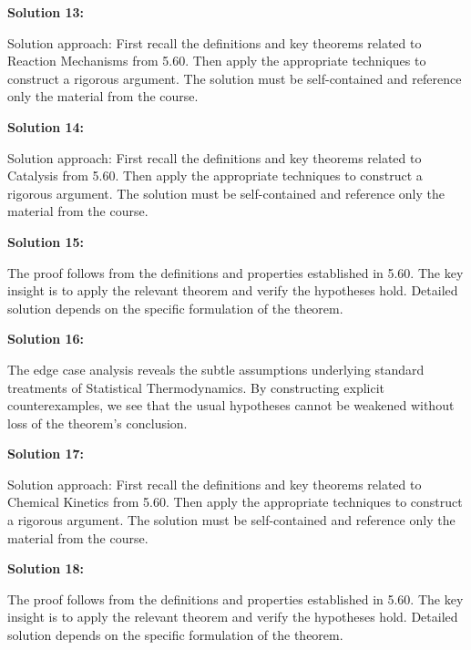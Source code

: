\documentclass[12pt,a4paper]{exam}
\begin{document}
\vspace{0.5cm}

\textbf{Solution 13:}

Solution approach: First recall the definitions and key theorems related to Reaction Mechanisms from 5.60. Then apply the appropriate techniques to construct a rigorous argument. The solution must be self-contained and reference only the material from the course.

\vspace{0.5cm}

\textbf{Solution 14:}

Solution approach: First recall the definitions and key theorems related to Catalysis from 5.60. Then apply the appropriate techniques to construct a rigorous argument. The solution must be self-contained and reference only the material from the course.

\vspace{0.5cm}

\textbf{Solution 15:}

The proof follows from the definitions and properties established in 5.60. The key insight is to apply the relevant theorem and verify the hypotheses hold. Detailed solution depends on the specific formulation of the theorem.

\vspace{0.5cm}

\textbf{Solution 16:}

The edge case analysis reveals the subtle assumptions underlying standard treatments of Statistical Thermodynamics. By constructing explicit counterexamples, we see that the usual hypotheses cannot be weakened without loss of the theorem's conclusion.

\vspace{0.5cm}

\textbf{Solution 17:}

Solution approach: First recall the definitions and key theorems related to Chemical Kinetics from 5.60. Then apply the appropriate techniques to construct a rigorous argument. The solution must be self-contained and reference only the material from the course.

\vspace{0.5cm}

\textbf{Solution 18:}

The proof follows from the definitions and properties established in 5.60. The key insight is to apply the relevant theorem and verify the hypotheses hold. Detailed solution depends on the specific formulation of the theorem.
\end{document}
